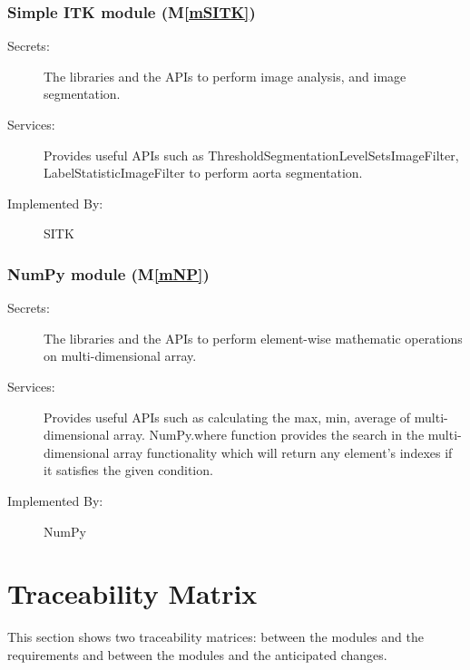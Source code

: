 \documentclass[12pt, titlepage]{article}
\newcounter{mnum}
\newcommand{\mthemnum}{M\themnum}
\newcommand{\mref}[1]{M\ref{#1}}
\begin{document}
\subsubsection{Simple ITK module (\mref{mSITK})}
\begin{description}
\item[Secrets:] The libraries and the APIs to perform image analysis, and image segmentation.
\item[Services:] Provides useful APIs such as ThresholdSegmentationLevelSetsImageFilter, LabelStatisticImageFilter to perform aorta segmentation.
\item[Implemented By:] SITK
\end{description}

\subsubsection{NumPy module (\mref{mNP})}
\begin{description}
\item[Secrets:] The libraries and the APIs to perform element-wise mathematic operations on multi-dimensional array.
\item[Services:] Provides useful APIs such as calculating the max, min, average of multi-dimensional array. NumPy.where function provides the search in the multi-dimensional array functionality which will return any element's indexes if it satisfies the given condition.
\item[Implemented By:] NumPy
\end{description}

\section{Traceability Matrix} \label{SecTM}


This section shows two traceability matrices: between the modules and the
requirements and between the modules and the anticipated changes.
\end{document}
